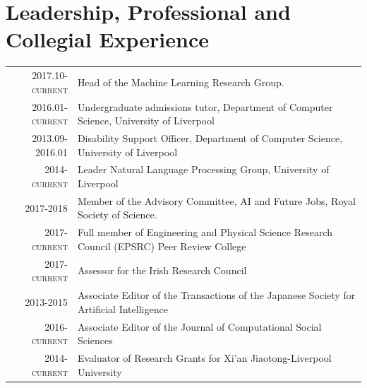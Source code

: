 \documentclass[a4paper,11pt]{article}
\begin{document}
\section{Leadership, Professional and Collegial Experience}
\begin{tabular}{r p{11cm}}
\textsc{2017.10-current} & Head of the Machine Learning Research Group.\\
\textsc{2016.01-current} & Undergraduate admissions tutor, Department of Computer Science, University of Liverpool \\
\textsc{2013.09-2016.01} & Disability Support Officer, Department of Computer Science, University of Liverpool \\
\textsc{2014-current} & Leader Natural Language Processing Group, University of Liverpool\\
\textsc{2017-2018} & Member of the Advisory Committee, AI and Future Jobs, Royal Society of Science.\\
\textsc{2017-current} & Full member of Engineering and  Physical Science Research Council (EPSRC) Peer Review College \\
\textsc{2017-current} & Assessor for the Irish Research Council \\
\textsc{2013-2015} & Associate Editor of the Transactions of the Japanese Society for Artificial Intelligence\\
\textsc{2016-current} & Associate Editor of the Journal of Computational Social Sciences\\
\textsc{2014-current} & Evaluator of Research Grants for Xi'an Jiaotong-Liverpool University
\end{tabular}
\end{document}

